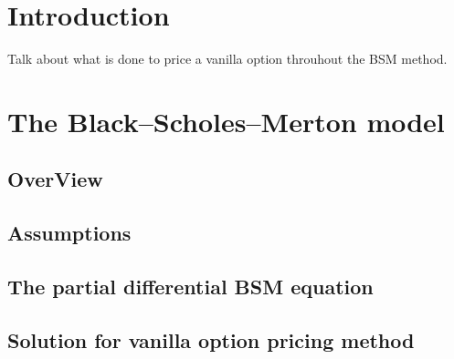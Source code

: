 \documentclass[12pt]{report}
\newcommand{\BSM}{Black--Scholes--Merton }
\begin{document}

\tableofcontents{}



%
%
\chapter*{Introduction}
\label{cha:Introduction}
Talk about what is done to price a vanilla option throuhout the BSM method.
%
%
\chapter{The \BSM model}
\label{cha:The \BSM model}


\section{OverView}
\label{sec:OverView}


\section{Assumptions}
\label{sec:Assumptions}


\section{The partial differential BSM equation}
\label{sec:The partial differential BSM equation}


\section{Solution for vanilla option pricing method}
\label{sec:Solution for vanilla option pricing method}
%
%
\end{document}
